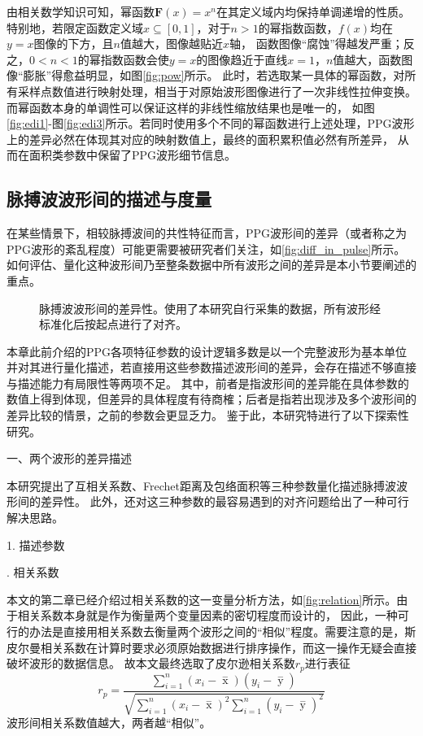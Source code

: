 由相关数学知识可知，幂函数$\boldsymbol F(x)=x^n$在其定义域内均保持单调递增的性质。特别地，若限定函数定义域$x\subseteq [0,1]$，对于$n>1$的幂指数函数，$f(x)$均在$y=x$图像的下方，且$n$值越大，图像越贴近$x$轴，
函数图像“腐蚀”得越发严重；反之，$0<n<1$的幂指数函数会使$y=x$的图像趋近于直线$x=1$，$n$值越大，函数图像“膨胀”得愈益明显，如图\autoref{fig:pow}所示。
此时，若选取某一具体的幂函数，对所有采样点数值进行映射处理，相当于对原始波形图像进行了一次非线性拉伸变换。而幂函数本身的单调性可以保证这样的非线性缩放结果也是唯一的，
如图\autoref{fig:edi1}-图\autoref{fig:edi3}所示。若同时使用多个不同的幂函数进行上述处理，PPG波形上的差异必然在体现其对应的映射数值上，最终的面积累积值必然有所差异，
从而在面积类参数中保留了PPG波形细节信息。

\subsection{脉搏波波形间的描述与度量}
在某些情景下，相较脉搏波间的共性特征而言，PPG波形间的差异（或者称之为PPG波形的紊乱程度）可能更需要被研究者们关注，如\autoref{fig:diff_in_pulse}所示。
如何评估、量化这种波形间乃至整条数据中所有波形之间的差异是本小节要阐述的重点。
\begin{figure}[htbp]
    \centering
    \quad
    \caption[脉搏波波形间的差异性]{\label{fig:diff_in_pulse}脉搏波波形间的差异性。使用了本研究自行采集的数据，所有波形经标准化后按起点进行了对齐。}
\end{figure}

本章此前介绍的PPG各项特征参数的设计逻辑多数是以一个完整波形为基本单位并对其进行量化描述，若直接用这些参数描述波形间的差异，会存在描述不够直接与描述能力有局限性等两项不足。
其中，前者是指波形间的差异能在具体参数的数值上得到体现，但差异的具体程度有待商榷；后者是指若出现涉及多个波形间的差异比较的情景，之前的参数会更显乏力。
鉴于此，本研究特进行了以下探索性研究。

一、两个波形的差异描述

本研究提出了互相关系数、Frechet距离及包络面积等三种参数量化描述脉搏波波形间的差异性。
此外，还对这三种参数的最容易遇到的对齐问题给出了一种可行解决思路。

1. 描述参数

. 相关系数

本文的第二章已经介绍过相关系数的这一变量分析方法，如\autoref{fig:relation}所示。由于相关系数本身就是作为衡量两个变量因素的密切程度而设计的，
因此，一种可行的办法是直接用相关系数去衡量两个波形之间的“相似”程度。需要注意的是，斯皮尔曼相关系数在计算时要求必须原始数据进行排序操作，而这一操作无疑会直接破坏波形的数据信息。
故本文最终选取了皮尔逊相关系数$r_p$进行表征
\begin{equation}
    \label{equ:pearson2}
    r_p=\frac{\sum_{i=1}^n{(x_i- \mathop{x} \limits^-)(y_i- \mathop{y} \limits^-)}}{\sqrt{{\sum_{i=1}^n}{{(x_i- \mathop{x} \limits^-)^2\sum_{i=1}^n}{(y_i- \mathop{y} \limits^-)^2}}}}
\end{equation}
波形间相关系数值越大，两者越“相似”。

